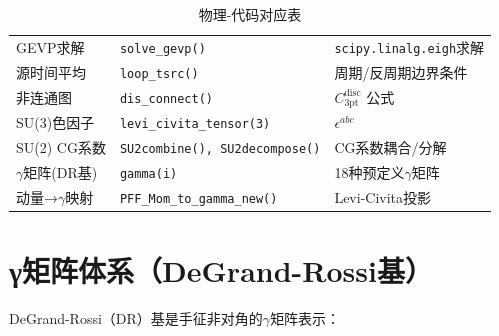 \documentclass[11pt,a4paper]{ctexart}
\begin{document}
\begin{table}[h]
\begin{tabular}{@{}p{5cm}p{3cm}p{6cm}@{}}
GEVP求解 & \texttt{solve\_gevp()} & \texttt{scipy.linalg.eigh}求解 \\
源时间平均 & \texttt{loop\_tsrc()} & 周期/反周期边界条件 \\
非连通图 & \texttt{dis\_connect()} & $C_{3\mathrm{pt}}^{\mathrm{disc}}$ 公式 \\
SU(3)色因子 & \texttt{levi\_civita\_tensor(3)} & $\epsilon^{abc}$ \\
SU(2) CG系数 & \texttt{SU2combine(), SU2decompose()} & CG系数耦合/分解 \\
$\gamma$矩阵(DR基) & \texttt{gamma(i)} & 18种预定义$\gamma$矩阵 \\
动量→$\gamma$映射 & \texttt{PFF\_Mom\_to\_gamma\_new()} & Levi-Civita投影 \\
\bottomrule
\end{tabular}
\caption{物理-代码对应表}
\end{table}

\section{γ矩阵体系（DeGrand-Rossi基）}

DeGrand-Rossi（DR）基是手征非对角的$\gamma$矩阵表示：
\end{document}
